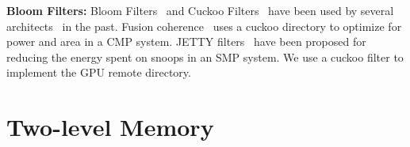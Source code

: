 \textbf{Bloom Filters:} Bloom Filters~\cite{Bloom1970} and Cuckoo
Filters~\cite{Pagh2004,fan2014} have been used by several
architects~\cite{Strauss2006,Zebchuk2009,Hongzhou2011} in the past. Fusion
coherence~\cite{wu2014} uses a cuckoo directory to optimize for power and area
in a CMP system. JETTY filters~\cite{Moshovos2001} have been proposed for
reducing the energy spent on snoops in an SMP system. We use a cuckoo filter to
implement the GPU remote directory.

\section{Two-level Memory}

